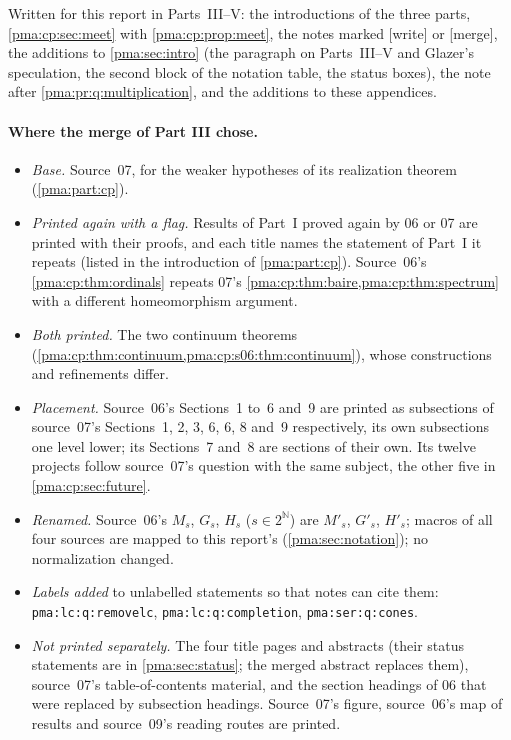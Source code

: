 \documentclass[11pt]{article}
\numberwithin{equation}{section}
\theoremstyle{definition}
\theoremstyle{remark}
\newcommand{\N}{\mathbb N}
\newcommand{\mergetag}{\textup{\textsf{\small[merge]}}}
\newcommand{\writetag}{\textup{\textsf{\small[write]}}}
\begin{document}
Written for this report in Parts~III--V: the introductions of the three
parts, \cref{pma:cp:sec:meet} with \cref{pma:cp:prop:meet}, the notes marked
\writetag{} or \mergetag, the additions to \cref{pma:sec:intro} (the
paragraph on Parts~III--V and Glazer's speculation, the second block of the
notation table, the status boxes), the note after
\cref{pma:pr:q:multiplication}, and the additions to these appendices.

\paragraph{Where the merge of Part III chose.}
\begin{itemize}
\item \emph{Base.} Source~07, for the weaker hypotheses of its realization
theorem (\cref{pma:part:cp}).
\item \emph{Printed again with a flag.} Results of Part~I proved again by 06
or 07 are printed with their proofs, and each title names the statement of
Part~I it repeats (listed in the introduction of \cref{pma:part:cp}). Source~06's
\cref{pma:cp:thm:ordinals} repeats 07's \cref{pma:cp:thm:baire,pma:cp:thm:spectrum}
with a different homeomorphism argument.
\item \emph{Both printed.} The two continuum theorems
(\cref{pma:cp:thm:continuum,pma:cp:s06:thm:continuum}), whose constructions and
refinements differ.
\item \emph{Placement.} Source~06's Sections~1 to~6 and~9 are printed as
subsections of source~07's Sections~1, 2, 3, 6, 6, 8 and~9 respectively, its
own subsections one level lower; its Sections~7 and~8 are sections of their
own. Its twelve projects follow source~07's question with the same
subject, the other five in \cref{pma:cp:sec:future}.
\item \emph{Renamed.} Source~06's $M_s$, $G_s$, $H_s$ ($s\in2^{\N}$) are
$M'_s$, $G'_s$, $H'_s$; macros of all four sources are mapped to this
report's (\cref{pma:sec:notation}); no normalization changed.
\item \emph{Labels added} to unlabelled statements so that notes can cite
them: \texttt{pma:lc:q:removelc},
\texttt{pma:lc:q:completion}, \texttt{pma:ser:q:cones}.
\item \emph{Not printed separately.} The four title pages and abstracts (their
status statements are in \cref{pma:sec:status}; the merged abstract replaces
them), source~07's table-of-contents material, and the section headings of
06 that were replaced by subsection headings. Source~07's figure, source~06's
map of results and source~09's reading routes are printed.
\end{itemize}
\end{document}
